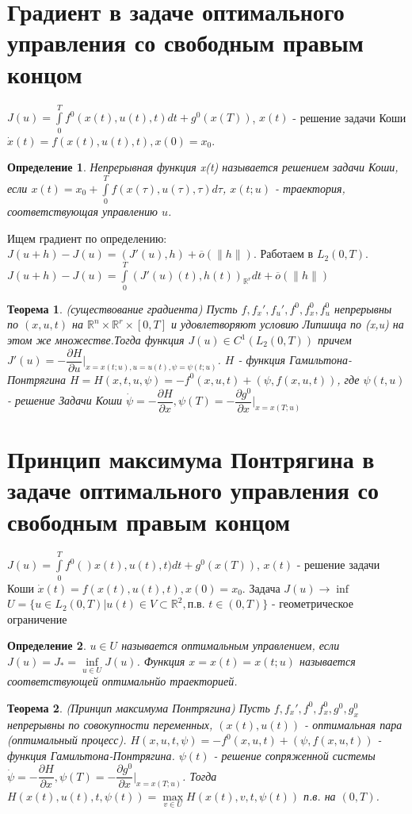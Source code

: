 \documentclass[9pt, a4paper]{extarticle}
\newtheorem*{theorem}{Теорема}
\newtheorem*{definition}{Определение}
\begin{document}
\section{Градиент в задаче оптимального управления со свободным правым концом}
	$J(u) = \int\limits_0^T f^0 (x(t), u(t), t) dt + g^0(x(T))$, $x(t)$ - решение задачи Коши $\dot{x}(t)  = f(x(t), u(t), t), x(0) = x_0$. 
	\begin{definition}
		Непрерывная функция x(t) называется решением задачи Коши, если $x(t) = x_0 + \int\limits_0^T f(x(\tau), u(\tau), \tau) d \tau$, $x(t;u)$ - траектория, соответствующая управлению $u$. 
	\end{definition}
	Ищем градиент по определению: $J(u+h) - J(u) = (J'(u), h) + \overline{o}(\|h\|)$. Работаем в $L_2(0,T)$. \newline
	\begin{math}
		J(u+h) - J(u) = \int\limits_0^T (J'(u)(t), h(t))_{\mathbb{R}^r} dt + \overline{o}(\|h\|)
	\end{math}
	\begin{theorem}
		(существование градиента)\newline
		Пусть $f, f_x', f_u', f^0, f_x^0, f_u^0$ непрерывны по $(x,u,t)$ на $\mathbb{R}^n \times \mathbb{R}^r \times[0,T]$ и удовлетворяют условию Липшица по (x,u) на этом же множестве.Тогда функция $J(u) \in C^1(L_2(0,T))$ причем $J'(u) = -\dfrac{\partial H}{\partial u} \vert_{x = x(t;u), u = u(t), \psi = \psi(t;u)}$. $H$ - функция Гамильтона-Понтрягина  $H = H(x,t,u, \psi) = -f^0(x,u,t) + (\psi, f(x,u,t))$, где $\psi(t,u)$ - решение Задачи Коши $\dot{\psi} = - \dfrac{\partial H}{\partial x}, \psi(T) = - \dfrac{\partial g^0}{\partial x}\vert_{x = x(T; u)}$
	\end{theorem}
\section{Принцип максимума Понтрягина в задаче оптимального управления со свободным правым концом}
	$J(u) = \int\limits_0^T f^0 ()x(t), u(t), t) dt + g^0(x(T))$, $x(t)$ - решение задачи Коши $\dot{x}(t)  = f(x(t), u(t), t), x(0) = x_0$. Задача $J(u) \to \inf$\newline
	$U = \{u \in L_2(0,T) \vert u(t) \in V \subset \mathbb{R}^2, \text{п.в. } t\in (0,T)\}$ - геометрическое ограничение
	\begin{definition}
		$u \in U$ называется оптимальным управлением, если $J(u) = J_* = \inf\limits_{u \in U} J(u)$. Функция $x = x(t) = x(t; u)$ называется соответствующей оптимальнйо траекторией.
	\end{definition}
	\begin{theorem}
		(Принцип максимума Понтрягина)\newline
			Пусть $f, f_x',  f^0, f_x^0, g^0, g_x^0$ непрерывны по совокупности переменных, $(x(t), u(t))$ - оптимальная пара (оптимальный процесс). $H(x,u, t, \psi) = - f^0(x,u,t) + (\psi, f(x,u,t))$ - функция Гамильтона-Понтрягина. $\psi(t)$ - решение сопряженной системы $\dot{\psi} = - \dfrac{\partial H}{\partial x}, \psi(T) = - \dfrac{\partial g^0}{\partial x}\vert_{x = x(T; u)}$. Тогда $H(x(t), u(t), t, \psi(t)) = \max\limits_{v \in U} H(x(t), v, t, \psi(t))$ п.в. на $(0,T)$.
	\end{theorem}
\end{document}
